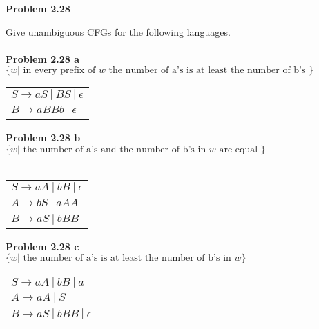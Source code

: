 \documentclass{article}
\newcommand{\problem}[1]{\large{\textbf{Problem #1} \\}}
\begin{document}
\pagebreak

\problem{2.28}

Give unambiguous CFGs for the following languages.\\ \\
\problem{2.28 a}
$\{w| \text{ in every prefix of } w \text{ the number of a's is at least the number of b's }\}$

\begin{table}[h!]
\centering
\begin{tabular}{l}
$S \rightarrow a S\: | \:B S \:|\: \epsilon $\\
$B \rightarrow a BB b \: | \: \epsilon$\\
\end{tabular}
\end{table}

\problem{2.28 b}
$\{w| \text{ the number of a's and the number of b's in } w \text{ are equal }\}$ \\ \\

\begin{table}[h!]
\centering
\begin{tabular}{l}
$S \rightarrow a A\: | \:b B \:|\: \epsilon $\\
$A \rightarrow b S \:| \:a AA $ \\
$B \rightarrow a S \:| \:b BB $ \\
\end{tabular}
\end{table}

\problem{2.28 c}
$\{w| \text{ the number of a's is at least the number of b's in } w\}$


\begin{table}[h!]
\centering
\begin{tabular}{l}
$S \rightarrow a A\: | \:b B \:|\: a $\\
$A \rightarrow a A \:| \:S $ \\
$B \rightarrow a S \:| \:b BB \:| \: \epsilon$ \\
\end{tabular}
\end{table}
\end{document}
